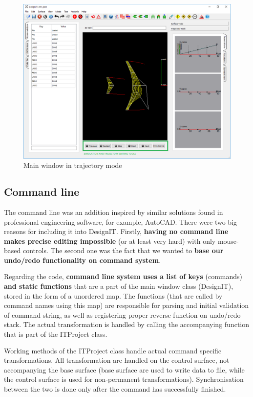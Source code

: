 \documentclass[a4paper, 11pt, article]{report}
\begin{document}
\begin{figure}[!h]
	\centering
	
	\includegraphics[width=\textwidth]{images/trajectory_window.png}
	
	\caption{Main window in trajectory mode}
	
	\label{gui_trajectory}
\end{figure}

\subsection{Command line}

The command line was an addition inspired by similar solutions found in professional engineering software, for example, AutoCAD. There were two big reasons for including it into DesignIT. Firstly, \textbf{having no command line makes precise editing impossible} (or at least very hard) with only mouse-based controls. The second one was the fact that we wanted to \textbf{base our undo/redo functionality on command system}.

Regarding the code, \textbf{command line system uses a list of keys} (commands) \textbf{and static functions} that are a part of the main window class (DesignIT), stored in the form of a unordered map. The functions (that are called by command names using this map) are responsible for parsing and initial validation of command string, as well as registering proper reverse function on undo/redo stack. The actual transformation is handled by calling the accompanying function that is part of the ITProject class.

Working methods of the ITProject class handle actual command specific transformations. All transformation are handled on the control surface, not accompanying the base surface (base surface are used to write data to file, while the control surface is used for non-permanent transformations). Synchronisation between the two is done only after the command has successfully finished.
\end{document}

